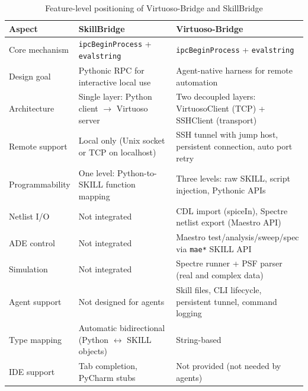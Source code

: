 \begin{table}[!t]
\caption{Feature-level positioning of Virtuoso-Bridge and SkillBridge}
\label{tab:comparison_ieee}
\centering
\small
\begin{tabular}{p{}p{}p{}}
\toprule
Aspect & SkillBridge & Virtuoso-Bridge \\
\midrule
Core mechanism & \texttt{ipcBeginProcess} + \texttt{evalstring} & \texttt{ipcBeginProcess} + \texttt{evalstring} \\
Design goal & Pythonic RPC for interactive local use & Agent-native harness for remote automation \\
Architecture & Single layer: Python client $\to$ Virtuoso server & Two decoupled layers: VirtuosoClient (TCP) + SSHClient (transport) \\
Remote support & Local only (Unix socket or TCP on localhost) & SSH tunnel with jump host, persistent connection, auto port retry \\
Programmability & One level: Python-to-SKILL function mapping & Three levels: raw SKILL, script injection, Pythonic APIs \\
Netlist I/O & Not integrated & CDL import (spiceIn), Spectre netlist export (Maestro API) \\
ADE control & Not integrated & Maestro test/analysis/sweep/spec via \texttt{mae*} SKILL API \\
Simulation & Not integrated & Spectre runner + PSF parser (real and complex data) \\
Agent support & Not designed for agents & Skill files, CLI lifecycle, persistent tunnel, command logging \\
Type mapping & Automatic bidirectional (Python $\leftrightarrow$ SKILL objects) & String-based \\
IDE support & Tab completion, PyCharm stubs & Not provided (not needed by agents) \\
\bottomrule
\end{tabular}
\end{table}
